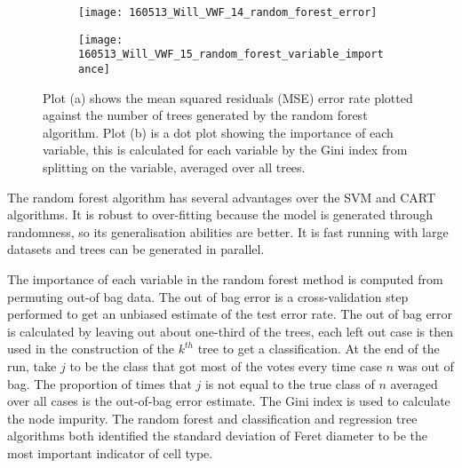 \begin{figure}[htbp]\centering
	\begin{subfigure}[b]{0.70\linewidth}
		\centering
		\texttt{[image: 160513\_Will\_VWF\_14\_random\_forest\_error]}
		\caption{}
		\label{figure:endothelial_morphometry:random_forest_error_rate}
	\end{subfigure}
	\begin{subfigure}[b]{0.79\linewidth}
		\centering
		\texttt{[image: 160513\_Will\_VWF\_15\_random\_forest\_variable\_importance]}
		\caption{}
		\label{figure:endothelial_morphometry:random_forest_variable_importance}
	\end{subfigure}
	\caption[Error rate and variable importance in random forest trees]{Plot (a) shows the mean squared residuals (MSE) error rate plotted against the number of trees generated by the random forest algorithm. Plot (b) is a dot plot showing the importance of each variable, this is calculated for each variable by the Gini index from splitting on the variable, averaged over all trees.}
\label{figure:endothelial_morphometry:random_forest_stats}
\end{figure}

The random forest algorithm has several advantages over the SVM and CART algorithms. It is robust to over-fitting because the model is generated through randomness, so its generalisation abilities are better. It is fast running with large datasets and trees can be generated in parallel.

The importance of each variable in the random forest method is computed from permuting out-of bag data. The out of bag error is a cross-validation step performed to get an unbiased estimate of the test error rate. The out of bag error is calculated by leaving out about one-third of the trees, each left out case is then used in the construction of the $k^{th}$ tree to get a classification. At the end of the run, take $j$ to be the class that got most of the votes every time case $n$ was out of bag. The proportion of times that $j$ is not equal to the true class of $n$ averaged over all cases is the out-of-bag error estimate. The Gini index is used to calculate the node impurity. The random forest and classification and regression tree algorithms both identified the standard deviation of Feret diameter to be the most important indicator of cell type.

